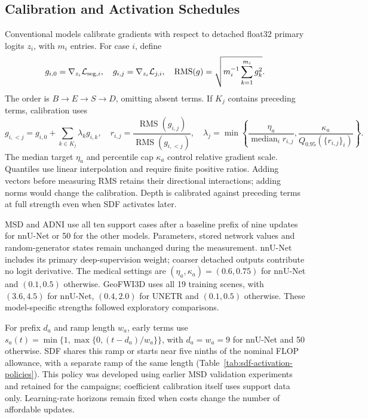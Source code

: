 \subsection{Calibration and Activation Schedules}
\label{sec:detailed-calibration}

Conventional models calibrate gradients with respect to detached
float32 primary logits $z_i$, with $m_i$ entries. For case $i$, define
\begin{equation}
g_{i,0}=\nabla_{z_i}\mathcal L_{{\rm seg},i},\quad
g_{i,j}=\nabla_{z_i}\mathcal L_{j,i},\quad
\operatorname{RMS}(g)=\sqrt{m_i^{-1}\sum_{k=1}^{m_i}g_k^2}.
\label{eq:calibration-logit-gradients}
\end{equation}
The order is $B\to E\to S\to D$, omitting absent terms. If $K_j$
contains preceding terms, calibration uses
\begin{equation}
g_{i,<j}=g_{i,0}+\sum_{k\in K_j}\lambda_k g_{i,k},\quad
r_{i,j}=\frac{\operatorname{RMS}(g_{i,j})}{\operatorname{RMS}(g_{i,<j})},\quad
\lambda_j=\min\left\{\frac{\eta_a}{\operatorname{median}_i r_{i,j}},
\frac{\kappa_a}{Q_{0.95}(\{r_{i,j}\}_i)}\right\}.
\label{eq:constraint-calibrated-coefficient}
\end{equation}
The median target $\eta_a$ and percentile cap $\kappa_a$ control relative
gradient scale. Quantiles use linear interpolation and require finite
positive ratios. Adding vectors before measuring RMS retains their
directional interactions; adding norms would change the calibration.
Depth is calibrated against preceding terms at full strength even when
SDF activates later.

MSD and ADNI use all ten support cases after a baseline prefix of nine
updates for nnU-Net or 50 for the other models. Parameters, stored
network values and random-generator states remain unchanged during
the measurement. nnU-Net includes its primary deep-supervision weight;
coarser detached outputs contribute no logit derivative. The medical
settings are $(\eta_a,\kappa_a)=(0.6,0.75)$ for nnU-Net and
$(0.1,0.5)$ otherwise. GeoFWI3D uses all 19 training scenes, with
$(3.6,4.5)$ for nnU-Net, $(0.4,2.0)$ for UNETR and $(0.1,0.5)$
otherwise. These model-specific strengths followed exploratory comparisons.

For prefix $d_a$ and ramp length $w_a$, early terms use
$s_a(t)=\min\{1,\max\{0,(t-d_a)/w_a\}\}$, with $d_a=w_a=9$
for nnU-Net and 50 otherwise. SDF shares this ramp or starts near
five ninths of the nominal FLOP allowance, with a separate ramp of
the same length (Table~\ref{tab:sdf-activation-policies}). This policy
was developed using earlier MSD validation experiments and retained
for the campaigns; coefficient calibration itself uses support data
only. Learning-rate horizons remain fixed when costs change the number
of affordable updates.

